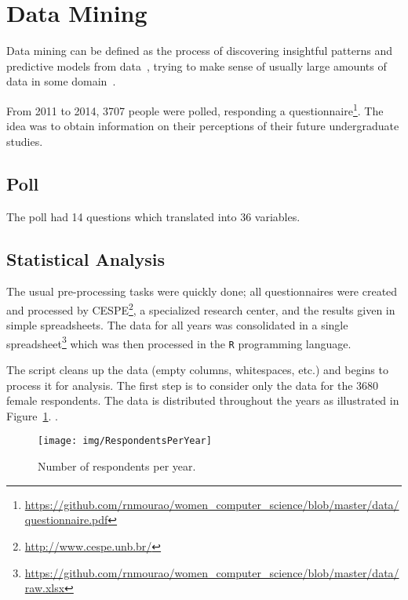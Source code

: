 \section{Data Mining}\label{sec:mining}%

Data mining can be defined as the process of discovering insightful patterns and predictive models from data~\cite{Zaki2014}, trying to make sense of usually large amounts of data in some domain~\cite{Cios2007}. 

From 2011 to 2014, 3707 people were polled, responding a questionnaire\footnote{\url{https://github.com/rnmourao/women\_computer\_science/blob/master/data/questionnaire.pdf}}. The idea was to obtain information on their perceptions of their future undergraduate studies.

\subsection{Poll}\label{sec:mining:poll}%
The poll had 14 questions which translated into 36 variables.

\subsection{Statistical Analysis}\label{sec:mining:stat}%
The usual pre-processing tasks were quickly done; all questionnaires were created and processed by CESPE\footnote{\url{http://www.cespe.unb.br/}}, a specialized research center, and the results given in simple spreadsheets. The data for all years was consolidated in a single spreadsheet\footnote{\url{https://github.com/rnmourao/women\_computer\_science/blob/master/data/raw.xlsx}}
which was then processed in the \texttt{R} programming language.

The script cleans up the data (empty columns, whitespaces, etc.) and begins to process it for analysis. The first step is to consider only the data for the 3680 female respondents. The data is distributed throughout the years as illustrated in Figure~\ref{fig:RespondentsPerYear}. .

\begin{figure}%
\texttt{[image: img/RespondentsPerYear]}%
\caption{Number of respondents per year.}%
\label{fig:RespondentsPerYear}%
\end{figure}%

